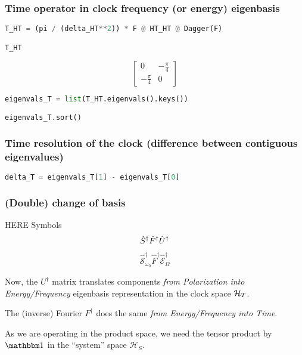 \subsubsection*{Time operator in clock frequency (or energy) eigenbasis}

\begin{lstlisting}[language=Python]
T_HT = (pi / (delta_HT**2)) * F @ HT_HT @ Dagger(F)

T_HT
\end{lstlisting}
$$
  \left[\begin{matrix}0 & - \frac{\pi}{4}\\- \frac{\pi}{4} & 0\end{matrix}\right]
$$
\begin{lstlisting}[language=Python]
eigenvals_T = list(T_HT.eigenvals().keys())

eigenvals_T.sort()
\end{lstlisting}

\subsubsection*{Time resolution of the clock (difference between contiguous eigenvalues)}

\begin{lstlisting}[language=Python]
delta_T = eigenvals_T[1] - eigenvals_T[0]
\end{lstlisting}

\subsubsection*{(Double) change of basis}

HERE Symbols
\begin{equation}
\hat{S}^{\dagger}\hat{F}^{\dagger}\hat{U}^{\dagger}
\end{equation}

\begin{equation}
  \hat{\mathcal{S}}_{\omega_0}^{\dagger} \hat{F}^{\dagger} \hat{\mathcal{E}}_{\Omega}^{\dagger}
\end{equation}

Now, the $U^{\dagger}$ matrix translates components \emph{from Polarization into Energy/Frequency} eigenbasis representation
in the clock space $\mathcal{H}_T$.

The (inverse) Fourier $F^{\dagger}$ does the same \emph{from Energy/Frequency into Time}.

As we are operating in the product space, we need the tensor product by $\idop$ in the ``system'' space $\mathcal{H}_S$.

